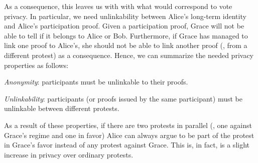 As a consequence, this leaves us with with what would correspond to vote privacy.
In particular, we need unlinkability between Alice's long-term identity and Alice's participation proof.
Given a participation proof, Grace will not be able to tell if it belongs to Alice or Bob.
Furthermore, if Grace has managed to link one proof to Alice's, she should not be able to link another proof (\eg, from a different protest) as a consequence.
Hence, we can summarize the needed privacy properties as follows:
\begin{requirements}[P]
\item\label{ProofUnlink} \emph{Anonymity}: participants must be unlinkable to their proofs.
\item\label{ProtestUnlink} \emph{Unlinkability}: participants (or proofs issued by the same participant) must be unlinkable between different protests.
\end{requirements}

As a result of these properties, if there are two protests in parallel (\eg, one against Grace's regime and one in favor) Alice can always argue to be part of the protest in Grace's favor instead of any protest against Grace.
This is, in fact, is a slight increase in privacy over ordinary protests.

